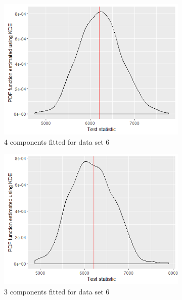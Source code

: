 \begin{figure}[!htb]
\begin{subfigure}[b]{0.4\textwidth}
		\includegraphics[width=\textwidth]{mainmatter/chapter_5_simulation_study/ppc_5wellsep4comp.png}
          \caption{\label{fig : ppc_5wellsep4comp}4 components fitted for data set 6}
	\end{subfigure}
	\begin{subfigure}[b]{0.4\textwidth}
		\includegraphics[width=\textwidth]{mainmatter/chapter_5_simulation_study/ppc_5wellsep3comp.png}
          \caption{\label{fig : ppc_5wellsep3comp}3 components fitted for data set 6}
	\end{subfigure}
	\begin{subfigure}[b]{0.4\textwidth}

\end{subfigure}
\end{figure}
